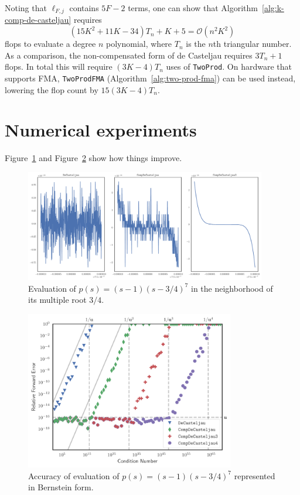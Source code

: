 \documentclass[letterpaper,10pt]{article}
\theoremstyle{definition}
\begin{document}
Noting that \(\ell_{F, j}\) contains \(5F - 2\) terms, one can
show that Algorithm~\ref{alg:k-comp-de-casteljau} requires
\begin{equation}
(15K^2 + 11K - 34)T_n + K + 5 =
\mathcal{O}\left(n^2 K^2\right)
\end{equation}
flops to evaluate a degree \(n\) polynomial, where \(T_n\) is the
\(n\)th triangular number. As a comparison, the non-compensated form of
de Casteljau requires \(3 T_n + 1\) flops. In total this will require
\((3K - 4)T_n\) uses of \texttt{TwoProd}. On hardware that supports
FMA, \texttt{TwoProdFMA} (Algorithm~\ref{alg:two-prod-fma}) can be used
instead, lowering the flop count by \(15(3K - 4)T_n\).

\section{Numerical experiments}\label{sec:numerical}

Figure~\ref{fig:smooth-drawing} and Figure~\ref{fig:compensated-k}
show how things improve.

\begin{figure}
  \includegraphics[width=0.9375\textwidth]{../images/de_casteljau_smooth_drawing.pdf}
  \centering
  \caption{Evaluation of \(p(s) = (s - 1)\left(s - 3/4\right)^7\)
    in the neighborhood of its multiple root \(3/4\).}
  \label{fig:smooth-drawing}
\end{figure}

\begin{figure}
  \includegraphics[width=0.8125\textwidth]{../images/de_casteljau_rel_error.pdf}
  \centering
  \caption{Accuracy of evaluation of \(p(s) = (s - 1)\left(s - 3/4\right)^7\)
    represented in Bernstein form.}
  \label{fig:compensated-k}
\end{figure}
\end{document}
